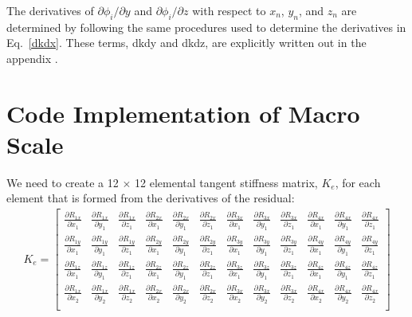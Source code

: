 The derivatives of $\partial \phi_i/\partial y$ and $\partial \phi_i/\partial z$ with respect to $x_n$, $y_n$, and $z_n$ are determined by following the same procedures used to determine the derivatives in Eq.\ \eqref{dkdx}. These terms, dkdy and dkdz, are explicitly written out in the appendix .

\section{Code Implementation of Macro Scale}

We need to create a 12 $\times$ 12 elemental tangent stiffness matrix, $K_e$, for each element that is formed from the derivatives of the residual:
%
\setcounter{MaxMatrixCols}{12}
\begin{eqnarray}
K_e = 
\begin{bmatrix}
\frac{\partial R_{1x}}{\partial x_1} & \frac{\partial R_{1x}}{\partial y_1} & \frac{\partial R_{1x}}{\partial z_1} & \frac{\partial R_{2x}}{\partial x_1} & \frac{\partial R_{2x}}{\partial y_1} & \frac{\partial R_{2x}}{\partial z_1} & \frac{\partial R_{3x}}{\partial x_1} & \frac{\partial R_{3x}}{\partial y_1} & \frac{\partial R_{3x}}{\partial z_1} & \frac{\partial R_{4x}}{\partial x_1} & \frac{\partial R_{4x}}{\partial y_1} & \frac{\partial R_{4x}}{\partial z_1} \\
\frac{\partial R_{1y}}{\partial x_1} & \frac{\partial R_{1y}}{\partial y_1} & \frac{\partial R_{1y}}{\partial z_1} & \frac{\partial R_{2y}}{\partial x_1} & \frac{\partial R_{2y}}{\partial y_1} & \frac{\partial R_{2y}}{\partial z_1} & \frac{\partial R_{3y}}{\partial x_1} & \frac{\partial R_{3y}}{\partial y_1} & \frac{\partial R_{3y}}{\partial z_1} & \frac{\partial R_{4y}}{\partial x_1} & \frac{\partial R_{4y}}{\partial y_1} & \frac{\partial R_{4y}}{\partial z_1} \\
\frac{\partial R_{1z}}{\partial x_1} & \frac{\partial R_{1z}}{\partial y_1} & \frac{\partial R_{1z}}{\partial z_1} & \frac{\partial R_{2z}}{\partial x_1} & \frac{\partial R_{2z}}{\partial y_1} & \frac{\partial R_{2z}}{\partial z_1} & \frac{\partial R_{3z}}{\partial x_1} & \frac{\partial R_{3z}}{\partial y_1} & \frac{\partial R_{3z}}{\partial z_1} & \frac{\partial R_{4z}}{\partial x_1} & \frac{\partial R_{4z}}{\partial y_1} & \frac{\partial R_{4z}}{\partial z_1} \\
\frac{\partial R_{1x}}{\partial x_2} & \frac{\partial R_{1x}}{\partial y_2} & \frac{\partial R_{1x}}{\partial z_2} & \frac{\partial R_{2x}}{\partial x_2} & \frac{\partial R_{2x}}{\partial y_2} & \frac{\partial R_{2x}}{\partial z_2} & \frac{\partial R_{3x}}{\partial x_2} & \frac{\partial R_{3x}}{\partial y_2} & \frac{\partial R_{3x}}{\partial z_2} & \frac{\partial R_{4x}}{\partial x_2} & \frac{\partial R_{4x}}{\partial y_2} & \frac{\partial R_{4x}}{\partial z_2} \\

\end{bmatrix}
\end{eqnarray}

